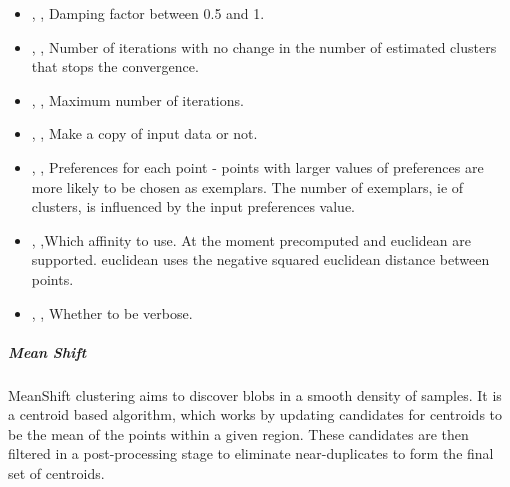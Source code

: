 \begin{itemize}
	\item {}, , Damping factor
 between 0.5 and 1. 
	\item {}, ,
Number of iterations with no change in the number of estimated clusters that
stops the convergence. 
	\item {}, , Maximum
 number of iterations. 
	\item {}, , Make a copy of
input data or not. 
	\item {}, , Preferences for each point - points with larger
values of preferences are more likely to be chosen as exemplars. The number
of exemplars, ie of clusters, is influenced by the input preferences value.
	\item {}, ,Which affinity to use.
 At the moment precomputed and euclidean are supported. euclidean uses the negative squared
euclidean distance between points. 
	\item {}, , Whether to be verbose.
\end{itemize}

\subparagraph{ Mean Shift } \hfill
\label{subparagraph:MeanShift}

MeanShift clustering aims to discover blobs in a smooth density of samples. It is
 a centroid based algorithm, which works by updating candidates for centroids to be
the mean of the points within a given region. These candidates are then filtered in
a post-processing stage to eliminate near-duplicates to form the final set of centroids.

